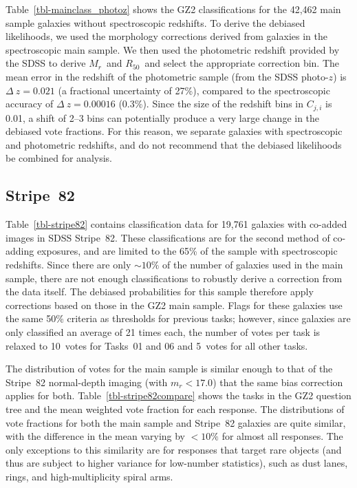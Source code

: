 \documentclass[useAMS,usenatbib]{mn2e}
\newcommand{\mr}{$M_r$}
\newcommand{\rfifty}{$R_{50}$}
\begin{document}
Table~\ref{tbl-mainclass_photoz} shows the GZ2 classifications for the 42,462 main sample galaxies without spectroscopic redshifts. To derive the debiased likelihoods, we used the morphology corrections derived from galaxies in the spectroscopic main sample. We then used the photometric redshift provided by the SDSS \citep{csa03} to derive \mr~and \rfifty~and select the appropriate correction bin. The mean error in the redshift of the photometric sample (from the SDSS photo-$z$) is $\Delta~z=0.021$ (a fractional uncertainty of 27\%), compared to the spectroscopic accuracy of $\Delta~z=0.00016$ (0.3\%). Since the size of the redshift bins in $C_{j,i}$ is 0.01, a shift of 2--3 bins can potentially produce a very large change in the debiased vote fractions. For this reason, we separate galaxies with spectroscopic and photometric redshifts, and do not recommend that the debiased likelihoods be combined for analysis. 


\subsection{Stripe~82}\label{ssec-s82}

Table~\ref{tbl-stripe82} contains classification data for 19,761 galaxies with co-added images in SDSS Stripe~82. These classifications are for the second method of co-adding exposures, and are limited to the 65\% of the sample with spectroscopic redshifts. Since there are only $\sim10\%$ of the number of galaxies used in the main sample, there are not enough classifications to robustly derive a correction from the data itself. The debiased probabilities for this sample therefore apply corrections based on those in the GZ2 main sample. Flags for these galaxies use the same 50\% criteria as thresholds for previous tasks; however, since galaxies are only classified an average of 21 times each, the number of votes per task is relaxed to 10~votes for Tasks~01 and 06 and 5~votes for all other tasks. 

The distribution of votes for the main sample is similar enough to that of the Stripe~82 normal-depth imaging (with $m_r<17.0$) that the same bias correction applies for both. Table~\ref{tbl-stripe82compare} shows the tasks in the GZ2 question tree and the mean weighted vote fraction for each response. The distributions of vote fractions for both the main sample and Stripe~82 galaxies are quite similar, with the difference in the mean varying by $<10\%$ for almost all responses. The only exceptions to this similarity are for responses that target rare objects (and thus are subject to higher variance for low-number statistics), such as dust lanes, rings, and high-multiplicity spiral arms. 
\end{document}
